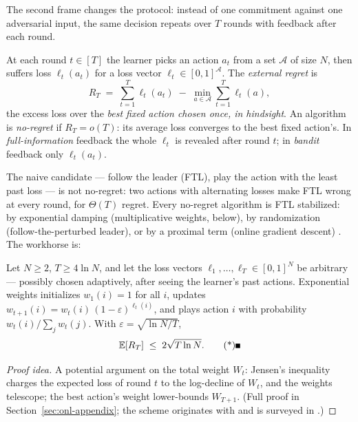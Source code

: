 The second frame changes the protocol: instead of one commitment against one adversarial
input, the same decision repeats over $T$ rounds with feedback after each round.

\begin{definition}\label{def:onl-regret}
At each round $t \in [T]$ the learner picks an action $a_t$ from a set $\mathcal{A}$ of
size $N$, then suffers loss $\ell_t(a_t)$ for a loss vector
$\ell_t \in [0,1]^{\mathcal{A}}$. The \emph{external regret} is
\[
R_T \;=\; \sum_{t=1}^{T}\ell_t(a_t) \;-\; \min_{a\in\mathcal{A}}
\sum_{t=1}^{T}\ell_t(a),
\]
the excess loss over the \emph{best fixed action chosen once, in hindsight}. An
algorithm is \emph{no-regret} if $R_T = o(T)$: its average loss converges to the best
fixed action's. In \emph{full-information} feedback the whole $\ell_t$ is revealed after
round $t$; in \emph{bandit} feedback only $\ell_t(a_t)$.
\end{definition}

The naive candidate --- follow the leader (FTL), play the action with the least past
loss --- is not no-regret: two actions with alternating losses make FTL wrong at every
round, for $\Theta(T)$ regret. Every no-regret algorithm is FTL stabilized: by
exponential damping (multiplicative weights, below), by randomization
(follow-the-perturbed leader), or by a proximal term (online gradient descent)
\citep{online-decisions-bg4,online-decisions-bg11}. The workhorse is:

\begin{theorem}\label{thm:onl-mw}
Let $N \ge 2$, $T \ge 4\ln N$, and let the loss vectors $\ell_1,\dots,\ell_T \in
[0,1]^N$ be arbitrary --- possibly chosen adaptively, after seeing the learner's past
actions. Exponential weights initializes $w_1(i) = 1$ for all $i$, updates
$w_{t+1}(i) = w_t(i)\,(1-\varepsilon)^{\ell_t(i)}$, and plays action $i$ with
probability $w_t(i)/\sum_j w_t(j)$. With $\varepsilon = \sqrt{\ln N / T}$,
\[
\mathbb{E}[R_T] \;\le\; 2\sqrt{T\ln N}. \eopm
\]
\end{theorem}

\begin{proof}[Proof idea]
A potential argument on the total weight $W_t$: Jensen's inequality charges the
expected loss of round $t$ to the log-decline of $W_t$, and the weights telescope; the
best action's weight lower-bounds $W_{T+1}$. (Full proof in
Section~\ref{sec:onl-appendix}; the scheme originates with
\citep{online-decisions-bg6,online-decisions-bg7} and is surveyed in
\citep{online-decisions-bg12}.)
\end{proof}

